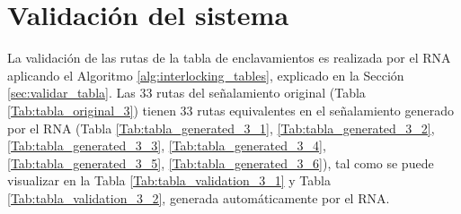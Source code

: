 \section{Validación del sistema}

	La validación de las rutas de la tabla de enclavamientos es realizada por el RNA aplicando el Algoritmo \ref{alg:interlocking_tables}, explicado en la Sección \ref{sec:validar_tabla}. Las 33 rutas del señalamiento original (Tabla \ref{Tab:tabla_original_3}) tienen 33 rutas equivalentes en el señalamiento generado por el RNA (Tabla \ref{Tab:tabla_generated_3_1}, \ref{Tab:tabla_generated_3_2}, \ref{Tab:tabla_generated_3_3}, \ref{Tab:tabla_generated_3_4}, \ref{Tab:tabla_generated_3_5}, \ref{Tab:tabla_generated_3_6}), tal como se puede visualizar en la Tabla \ref{Tab:tabla_validation_3_1} y Tabla \ref{Tab:tabla_validation_3_2}, generada automáticamente por el RNA.

